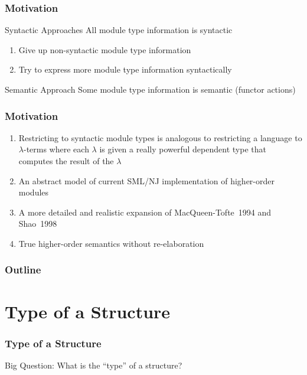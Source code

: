 \documentclass{beamer}
\begin{document}
	\begin{frame}
		\frametitle{Motivation}
		\begin{block}{Syntactic Approaches}
			All module type information is syntactic
			\begin{enumerate}
				\item Give up non-syntactic module type information
				\item Try to express more module type information syntactically 
			\end{enumerate}
		\end{block}
		\vspace{4mm}
		\begin{block}{Semantic Approach}
			Some module type information is semantic (functor actions)
		\end{block}
	\end{frame}
	
	\begin{frame}[fragile]
		\frametitle{Motivation}
		\begin{enumerate}
			\itemsep=4mm
			\item Restricting to syntactic module types is analogous to restricting a language to $\lambda$-terms where each $\lambda$ is given a really powerful dependent type that computes the result of the $\lambda$
			\item An abstract model of current SML/NJ implementation of higher-order modules
			\item A more detailed and realistic expansion of MacQueen-Tofte~1994 and  Shao~1998 
			\item True higher-order semantics without re-elaboration
		\end{enumerate}
	\end{frame}
		
	\begin{frame}
		\frametitle{Outline}
		\tableofcontents
	\end{frame}
	
	\section{Type of a Structure}

\begin{frame}
	\frametitle{Type of a Structure}
	{\Large Big Question: What is the ``type'' of a structure?}
\end{frame}
\end{document}
